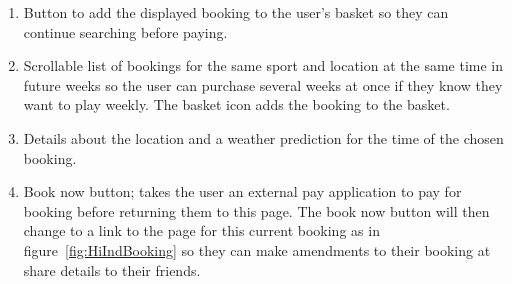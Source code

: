 \begin{enumerate}
	\item Button to add the displayed booking to the user's basket so they can
		continue searching before paying.
	\item Scrollable list of bookings for the same sport and location at the
		same time in future weeks so the user can purchase several weeks at
		once if they know they want to play weekly. The basket icon adds the
		booking to the basket.
	\item Details about the location and a weather prediction for the time of
		the chosen booking.
	\item Book now button; takes the user an external pay application to pay
		for booking before returning them to this page. The book now button
		will then change to a link to the page for this current booking as
		in figure~\ref{fig:HiIndBooking} so they can make amendments to their
		booking at share details to their friends.
\end{enumerate}
